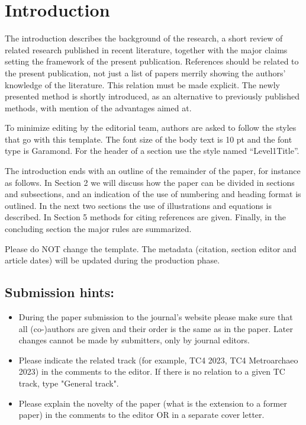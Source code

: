 \documentclass[final]{imeko_acta}
\begin{document}
\section{Introduction}

The introduction describes the background of the research, a 
short review of related research published in recent literature, 
together with the major claims setting the framework of the 
present publication. References should be related to the present 
publication, not just a list of papers merrily showing the authors'
knowledge of the literature. This relation must be made explicit. 
The newly presented method is shortly introduced, as an 
alternative to previously published methods, with mention of the 
advantages aimed at.

To minimize editing by the editorial team, authors are asked 
to follow the styles that go with this template. The font size of 
the body text is 10 pt and the font type is Garamond. For the 
header of a section use the style named “Level1Title”.

The introduction ends with an outline of the remainder of the 
paper, for instance as follows. In Section 2 we will discuss how 
the paper can be divided in sections and subsections, and an 
indication of the use of numbering and heading format is 
outlined. In the next two sections the use of illustrations and 
equations is described. In Section 5 methods for citing references 
are given. Finally, in the concluding section the major rules are 
summarized.

Please do NOT change the template. The metadata (citation,
section editor and article dates) will be updated during the
production phase.

\subsection*{Submission hints:}
\begin{itemize}
	\item During the paper submission to the journal’s website
	please make sure that all (co-)authors are given and their
	order is the same as in the paper. Later changes cannot
	be made by submitters, only by journal editors.
	\item Please indicate the related track (for example, TC4 2023,
	TC4 Metroarchaeo 2023) in the comments to the editor.
	If there is no relation to a given TC track, type "General
	track".
	\item Please explain the novelty of the paper (what is the
	extension to a former paper) in the comments to the
	editor OR in a separate cover letter.
\end{itemize}
\end{document}
